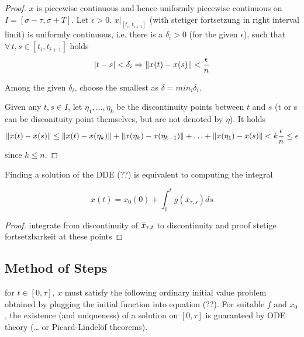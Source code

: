 \documentclass[10pt]{article}
\begin{document}
\begin{proof}
    $x$ is piecewise continuous and hence uniformly piecewise continuous on $I=[\sigma-\tau,\sigma+T]$.
    Let $\epsilon > 0$. $x|_{[t_i,t_{i+1}]}$ (with stetiger fortsetzung in right interval limit) is uniformly continuous, i.e. there is a $\delta_i > 0$ (for the given $\epsilon$), such that $\forall\,t, s \in [t_i,t_{i+1}]$ holds
    \begin{equation}
        \lvert t-s\rvert < \delta_i \Rightarrow \lVert x(t)-x(s)\rVert < \frac{\epsilon}{n}
    \end{equation}

    Among the given $\delta_i$, choose the smallest as $\delta = min_i \delta_i$.

    Given any $t,s \in I$, let $\eta_1,\ldots,\eta_k$ be the discontinuity points between $t$ and $s$ (t or s can be disconituity point themselves, but are not denoted by $\eta$). It holds
    \begin{equation}
        \lVert x(t)-x(s)\rVert \leq \lVert x(t)-x(\eta_k)\rVert + \lVert x(\eta_k)-x(\eta_{k-1})\rVert + \ldots + \lVert x(\eta_1)-x(s)\rVert
        < k\frac{\epsilon}{n} \leq \epsilon
    \end{equation}
    since $k \leq n$.


\end{proof}

\begin{lemma}
    \label{lemma-integral-equation}


    Finding a solution of the DDE (??) is equivalent to computing the integral

    \begin{equation}
        x(t) = x_0(0) + \int_0^t g(\bar{x}_{\tau,s})ds
    \end{equation}

\end{lemma}

\begin{proof}
integrate from discontinuity of $\bar{x}_{\tau,t}$ to discontinuity and proof stetige fortsetzbarkeit at these points
\end{proof}

\subsection{Method of Steps} \label{sec:method-of-steps}
for $t\in [0,\tau]$, $x$ must satisfy the following ordinary initial value problem obtained by plugging the initial function into equation (??). For suitable $f$ and $x_0$, the existence (and uniqueness) of a solution on $[0,\tau]$ is guaranteed by ODE theory (\ldots{} or Picard-Lindelöf theorems).
\end{document}

